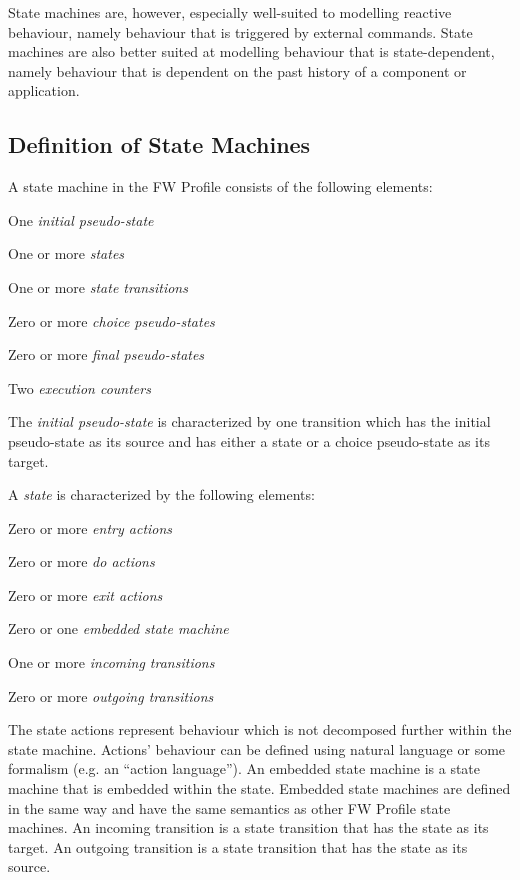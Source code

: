 \documentclass[definition]{../fwprofile}
\begin{document}
State machines are, however, especially well-suited to modelling reactive behaviour, namely
behaviour that is triggered by external commands. State machines are also better suited at
modelling behaviour that is state-dependent, namely behaviour that is dependent on the past
history of a component or application.


\subsection{Definition of State Machines}\label{sec:smDefinition}
A state machine in the FW Profile consists of the following elements:

\begin{fw_itemize} 
\item One \emph{initial pseudo-state}
\item One or more \emph{states}
\item One or more \emph{state transitions}
\item Zero or more \emph{choice pseudo-states}
\item Zero or more \emph{final pseudo-states}
\item Two \emph{execution counters}
\end{fw_itemize}

The \emph{initial pseudo-state} is characterized by one transition which has the initial pseudo-state as
its source and has either a state or a choice pseudo-state as its target.

A \emph{state} is characterized by the following elements:

\begin{fw_itemize} 
\item Zero or more \emph{entry actions}
\item Zero or more \emph{do actions}
\item Zero or more \emph{exit actions}
\item Zero or one \emph{embedded state machine}
\item One or more \emph{incoming transitions}
\item Zero or more \emph{outgoing transitions}
\end{fw_itemize}

The state actions represent behaviour which is not decomposed further within the state
machine. Actions' behaviour can be defined using natural language or some formalism (e.g. an
“action language”). An embedded state machine is a state machine that is embedded within the
state. Embedded state machines are defined in the same way and have the same semantics as
other FW Profile state machines. An incoming transition is a state transition that has the state
as its target. An outgoing transition is a state transition that has the state as its source.
\end{document}
